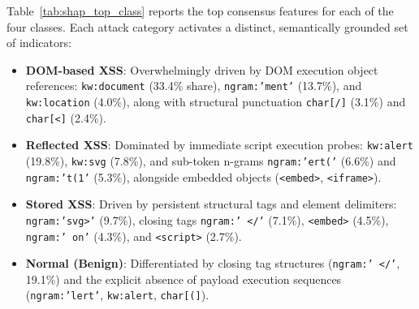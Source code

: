 \documentclass[11pt,a4paper]{article}
\begin{document}
Table~\ref{tab:shap_top_class} reports the top consensus features for each of the four classes.
Each attack category activates a distinct, semantically grounded set of indicators:
\begin{itemize}
  \item \textbf{DOM-based XSS}: Overwhelmingly driven by DOM execution object references: \texttt{kw:document} (33.4\% share), \texttt{ngram:'ment'} (13.7\%), and \texttt{kw:location} (4.0\%), along with structural punctuation \texttt{char[/]} (3.1\%) and \texttt{char[<]} (2.4\%).
  \item \textbf{Reflected XSS}: Dominated by immediate script execution probes: \texttt{kw:alert} (19.8\%), \texttt{kw:svg} (7.8\%), and sub-token n-grams \texttt{ngram:'ert('} (6.6\%) and \texttt{ngram:'t(1'} (5.3\%), alongside embedded objects (\texttt{<embed>}, \texttt{<iframe>}).
  \item \textbf{Stored XSS}: Driven by persistent structural tags and element delimiters: \texttt{ngram:'svg>'} (9.7\%), closing tags \texttt{ngram:' </'} (7.1\%), \texttt{<embed>} (4.5\%), \texttt{ngram:' on'} (4.3\%), and \texttt{<script>} (2.7\%).
  \item \textbf{Normal (Benign)}: Differentiated by closing tag structures (\texttt{ngram:' </'}, 19.1\%) and the explicit absence of payload execution sequences (\texttt{ngram:'lert'}, \texttt{kw:alert}, \texttt{char[(]}).
\end{itemize}
\end{document}
